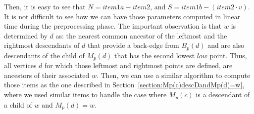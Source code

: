 \documentclass[11pt,a4paper]{article}
\begin{document}
Then, it is easy to see that $N=\mathit{item1a}-\mathit{item2}$, and $S=\mathit{item1b}-(\mathit{item2}\cdot v)$.
It is not difficult to see how we can have those parameters computed in linear time during the preprocessing phase. The important observation is that $w$ is determined by $d$ as: the nearest common ancestor of the leftmost and the rightmost descendants of $d$ that provide a back-edge from $B_p(d)$ and are also descendants of the child of $M_p(d)$ that has the second lowest $\mathit{low}$ point. Thus, all vertices $d$ for which those leftmost and rightmost points are defined, are ancestors of their associated $w$. Then, we can use a similar algorithm to compute those items as the one described in Section~\ref{section:Mp(c)descDandMp(d)=w}, where we used similar items to handle the case where $M_p(c)$ is a descendant of a child of $w$ and $M_p(d)=w$.













\end{document}
